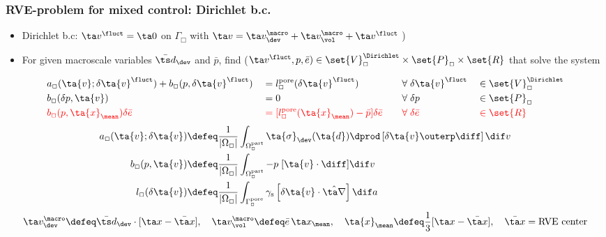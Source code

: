 \documentclass[11pt]{beamer} %
\newcommand{\pore}{\mathrm{pore}}
\newcommand{\particle}{\mathrm{part}}
\newcommand{\surf}{\mathrm{s}}
\renewcommand{\alert}[1]{\textbf{#1}}
\begin{document}
\begin{frame}
\frametitle{RVE-problem for mixed control: Dirichlet b.c.}
 \begin{itemize}
  \item Dirichlet b.c: $\ta v^\fluct = \ta 0$ on $\Gamma_\Box$ with $\ta v = \ta v^\macro_\dev + \ta v^\macro_\vol + \ta v^\fluct$ )
  \item For given macroscale variables $\bar{\ts d}_\dev$ and $\bar p$, find ($\ta v^\fluct,p,\bar{e})\in\set{V}_\Box^{\Dirichlet}\times\set{P}_\Box\times\set{R}$ that solve the system
 \end{itemize}
\vspace{-2truemm}
\begin{alignat*}{4}
    & a_\Box(\ta{v};\delta \ta{v}^\fluct) +  b_\Box(p,\delta\ta{v}^\fluct)
    && =
    l^\pore_\Box(\delta \ta{v}^\fluct)
    &\quad& \forall\; \delta \ta{v}^\fluct &&\in \set{V}_\Box^{\Dirichlet}
 \\
    &b_\Box(\delta p, \ta{v})
    && =
    0
    && \forall\; \delta p &&\in \set{P}_\Box
\\
    &\color{red}b_\Box(p,\ta{x}_\mean)\delta\bar{e}
    &&\color{red} =
    [l_\Box^\pore(\ta{x}_\mean) - \bar{p}]\delta\bar{e}
    &&\color{red} \forall\; \delta\bar{e} &&\color{red}\in \set{R}
\end{alignat*}
\vspace{-5truemm}
\begin{align*}
    a_\Box(\ta{v};\delta \ta{v})
    & \defeq
    \frac{1}{|\Omega_\Box|}\int_{\Omega^\particle_\Box} \ta{\sigma}_\dev(\ta{d}) \dprod \left[\delta \ta{v} \outerp \diff\right] \dif v
\\
    b_\Box(p, \ta{v})
    & \defeq
    \frac{1}{|\Omega_\Box|}\int_{\Omega^\particle_\Box} -p\;[\ta{v}\cdot \diff] \dif v
\\
    l_\Box(\delta \ta{v})
    & \defeq
    \frac{1}{|\Omega_{\Box}|} \int_{\Gamma_{\Box}^\pore}
  \gamma_\surf\left[\delta\ta{v}\cdot\hat{\ta\nabla}\right] \dif a
\end{align*}
\begin{gather*}
 \ta v_\dev^\macro \defeq \bar{\ts d}_\dev \cdot[\ta x - \bar{\ta x}], \quad \ta v_\vol^\macro \defeq \bar{e}\,\ta x_\mean,\quad \ta{x}_\mean \defeq \frac13[\ta x-\bar{\ta x}], \quad \bar{\ta x} = \text{RVE center}
\end{gather*}
\end{frame}
\end{document}
